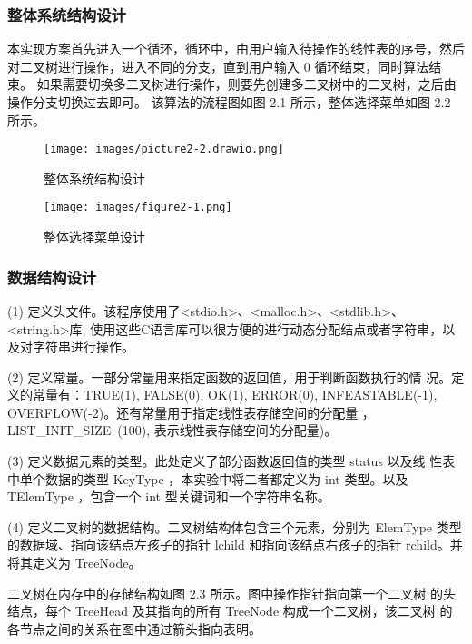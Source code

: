 \documentclass[supercite]{Experimental_Report}
\theoremstyle{definition}
\begin{document}
\subsubsection{整体系统结构设计}
本实现方案首先进入一个循环，循环中，由用户输入待操作的线性表的序号，然后对二叉树进行操作，进入不同的分支，直到用户输入 0 循环结束，同时算法结束。
如果需要切换多二叉树进行操作，则要先创建多二叉树中的二叉树，之后由操作分支切换过去即可。
该算法的流程图如图 2.1 所示，整体选择菜单如图 2.2 所示。

\begin{figure}[H]
	\begin{center}
		\texttt{[image: images/picture2-2.drawio.png]}
		\vspace{0.6cm}
		\caption{整体系统结构设计}
		\label{fig2-2}
	\end{center}
\end{figure}

\begin{figure}[H]
	\begin{center}
		\texttt{[image: images/figure2-1.png]}
		\vspace{0.6cm}
		\caption{整体选择菜单设计}
		\label{fig2-2}
	\end{center}
\end{figure}

\subsubsection{数据结构设计}
(1) 定义头文件。该程序使用了<stdio.h>、<malloc.h>、<stdlib.h>、<string.h>库,
使用这些C语言库可以很方便的进行动态分配结点或者字符串，以及对字符串进行操作。

(2) 定义常量。一部分常量用来指定函数的返回值，用于判断函数执行的情
况。定义的常量有：TRUE(1), FALSE(0), OK(1), ERROR(0), INFEASTABLE(-1),
OVERFLOW(-2)。还有常量用于指定线性表存储空间的分配量 ，
LIST\_INIT\_SIZE\ (100), 表示线性表存储空间的分配量)。

(3) 定义数据元素的类型。此处定义了部分函数返回值的类型 status 以及线
性表中单个数据的类型 KeyType ，本实验中将二者都定义为 int 类型。以及 TElemType ，包含一个 int 型关键词和一个字符串名称。

(4) 定义二叉树的数据结构。二叉树结构体包含三个元素，分别为 ElemType
类型的数据域、指向该结点左孩子的指针 lchild 和指向该结点右孩子的指针
rchild。并将其定义为 TreeNode。

二叉树在内存中的存储结构如图 2.3 所示。图中操作指针指向第一个二叉树
的头结点，每个 TreeHead 及其指向的所有 TreeNode 构成一个二叉树，该二叉树
的各节点之间的关系在图中通过箭头指向表明。
\end{document}
